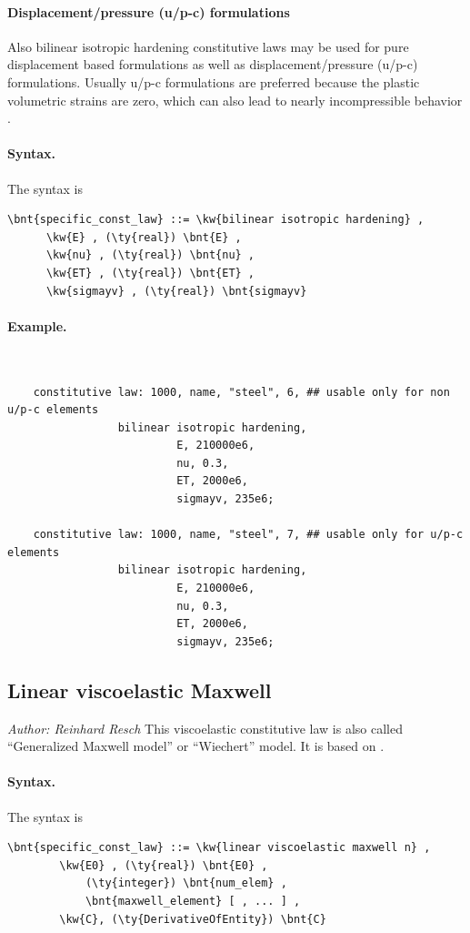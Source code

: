 \paragraph{Displacement/pressure (u/p-c) formulations}
Also bilinear isotropic hardening constitutive laws may be used for pure displacement based formulations
as well as displacement/pressure (u/p-c) formulations. Usually u/p-c formulations are preferred because
the plastic volumetric strains are zero, which can also lead to nearly incompressible behavior \cite{BATHE2016}.
\paragraph{Syntax.}
The syntax is
\begin{Verbatim}[commandchars=\\\{\}]
    \bnt{specific_const_law} ::= \kw{bilinear isotropic hardening} ,
      \kw{E} , (\ty{real}) \bnt{E} ,
      \kw{nu} , (\ty{real}) \bnt{nu} ,
      \kw{ET} , (\ty{real}) \bnt{ET} ,
      \kw{sigmayv} , (\ty{real}) \bnt{sigmayv}
\end{Verbatim}

\paragraph{Example.} \
\begin{verbatim}
    constitutive law: 1000, name, "steel", 6, ## usable only for non u/p-c elements
                 bilinear isotropic hardening,
                          E, 210000e6,
                          nu, 0.3,
                          ET, 2000e6,
                          sigmayv, 235e6;

    constitutive law: 1000, name, "steel", 7, ## usable only for u/p-c elements
                 bilinear isotropic hardening,
                          E, 210000e6,
                          nu, 0.3,
                          ET, 2000e6,
                          sigmayv, 235e6;
\end{verbatim}

\subsection{Linear viscoelastic Maxwell}
\label{sec:CL:linear-viscoelastic-maxwell}
\emph{Author: Reinhard Resch}
This viscoelastic constitutive law is also called ``Generalized Maxwell model'' or ``Wiechert'' model.
It is based on \cite{bleyer2018numericaltours}.
\paragraph{Syntax.}
The syntax is
\begin{Verbatim}[commandchars=\\\{\}]
    \bnt{specific_const_law} ::= \kw{linear viscoelastic maxwell n} ,
        \kw{E0} , (\ty{real}) \bnt{E0} ,
            (\ty{integer}) \bnt{num_elem} ,
            \bnt{maxwell_element} [ , ... ] ,
        \kw{C}, (\ty{DerivativeOfEntity}) \bnt{C}
\end{Verbatim}


